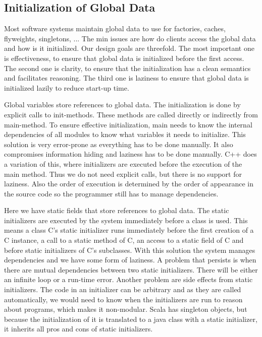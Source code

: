 \subsection{Initialization of Global Data}
\begin{mytitle} Most software systems maintain global data to use for factories, caches, flyweights, singletons, ... The min issues are how do clients access the global data and how is it initialized. Our design goals are threefold. The most important one is effectiveness, to ensure that global data is initialized before the first access. The second one is clarity, to ensure that the initialization has a clean semantics and facilitates reasoning. The third one is laziness to ensure that global data is initialized lazily to reduce start-up time.
\end{mytitle}
\begin{mytitle} Global variables store references to global data. The initialization is done by explicit calls to init-methods. These methods are called directly or indirectly from main-method. To ensure effective initialization, main needs to know the internal dependencies of all modules to know what variables it needs to initialize. This solution is very error-prone as everything has to be done manually. It also compromises information hiding and laziness has to be done manually. C++ does a variation of this, where initializers are executed before the execution of the main method. Thus we do not need explicit calls, but there is no support for laziness. Also the order of execution is determined by the order of appearance in the source code so the programmer still has to manage dependencies.
\end{mytitle}
\begin{mytitle} Here we have static fields that store references to global data. The static initializers are executed by the system immediately before a class is used. This means a class C's static initializer runs immediately before the first creation of a C instance, a call to a static method of C, an access to a static field of C and before static initializers of C's subclasses. With this solution the system manages dependencies and we have some form of laziness. A problem that persists is when there are mutual dependencies between two static initializers. There will be either an infinite loop or a run-time error. Another problem are side effects from static initializers. The code in an initializer can be arbitrary and as they are called automatically, we would need to know when the initializers are run to reason about programs, which makes it non-modular. Scala has singleton objects, but because the initialization of it is translated to a java class with a static initializer, it inherits all pros and cons of static initializers.
\end{mytitle}
